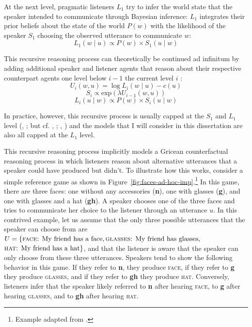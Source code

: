 At the next level, pragmatic listeners $L_1$ try to infer the world state that the speaker intended to communicate
through Bayesian inference: $L_1$ integrates their prior beliefs about the state of the world $P(w)$ with the likelihood
of the speaker $S_1$ choosing the observed utterance to communicate $w$:
$$L_1(w \mid u) \propto P(w) \times S_1(u \mid w)$$

This recursive reasoning process can theoretically be continued ad infinitum by adding additional speaker and listener agents that 
reason about their respective counterpart agents one level below $i-1$ the current level $i$ \cite{Franke2009}:
$$U_i(w,u) = \log L_{i}(w \mid u) - c(u)$$
$$S_i \propto \mbox{exp} \left( \lambda U_{i-1}(w,u) \right)$$
$$ L_i(u \mid w) \propto P(w) \times S_i(u \mid w)$$

In practice, however, this recursive process is usually capped at the $S_1$ and $L_1$ level (\citeauthor{Franke2016b}, \citeyear{Franke2016b}; but cf. \citeauthor{Lassiter2017b}, \citeyear{Lassiter2017b}; \citeauthor{Bergen2016}, \citeyear{Bergen2016}) and the models
that I will consider in this dissertation are also all capped at the $L_1$ level.



This recursive reasoning process implicitly models a Gricean counterfactual reasoning process in which listeners reason about alternative utterances
that a speaker could have produced but didn't. To illustrate how this works, consider a simple reference game as shown in Figure~\ref{fig:faces-ad-hoc-imp}.\footnote{Example adapted from \textcite{Goodman2016}.} In this game,
there are three faces: one without any accessories (\textbf{n}), one with glasses (\textbf{g}), and one with glasses and a hat (\textbf{gh}). A speaker chooses one of the three faces
and tries to communicate her choice to the listener through an utterance $u$. In this contrived example, let us assume that the only three possible utterances that the
speaker can choose from are $U=\{\mbox{\textsc{face}: My friend has a face},\mbox{\textsc{glasses}: My friend has glasses},$ \\ $\mbox{\textsc{hat}: My friend has a hat}\}$, 
and that the listener is aware that the speaker can only choose from these three utterances. Speakers tend to show the following behavior in this game. If they refer
to \textbf{n}, they produce \textsc{face}, if they refer to \textbf{g}  they produce \textsc{glasses}, and if they refer to \textbf{gh} they produce \textsc{hat}. Conversely, listeners infer that 
the speaker likely referred to \textbf{n} after hearing \textsc{face}, to \textbf{g}  after hearing \textsc{glasses}, and to \textbf{gh} after hearing \textsc{hat}.

